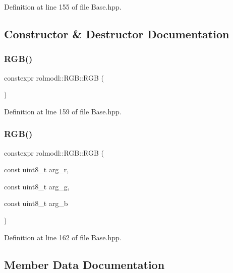 Definition at line 155 of file Base.\+hpp.



\subsection{Constructor \& Destructor Documentation}
\mbox{\label{structrolmodl_1_1_r_g_b_a8bb4c60c447cdf7bbac5c6379ec54359}} 
\subsubsection{\texorpdfstring{RGB()}{RGB()}\hspace{0.1cm}{\footnotesize\ttfamily [1/2]}}
{\footnotesize\ttfamily constexpr rolmodl\+::\+R\+G\+B\+::\+R\+GB (\begin{DoxyParamCaption}{ }\end{DoxyParamCaption})\hspace{0.3cm}{\ttfamily [inline]}}



Definition at line 159 of file Base.\+hpp.

\mbox{\label{structrolmodl_1_1_r_g_b_a9f2fdf965d5e0a9a720babd959cd5c25}} 
\subsubsection{\texorpdfstring{RGB()}{RGB()}\hspace{0.1cm}{\footnotesize\ttfamily [2/2]}}
{\footnotesize\ttfamily constexpr rolmodl\+::\+R\+G\+B\+::\+R\+GB (\begin{DoxyParamCaption}\item[{const uint8\+\_\+t}]{arg\+\_\+r,  }\item[{const uint8\+\_\+t}]{arg\+\_\+g,  }\item[{const uint8\+\_\+t}]{arg\+\_\+b }\end{DoxyParamCaption})\hspace{0.3cm}{\ttfamily [inline]}}



Definition at line 162 of file Base.\+hpp.



\subsection{Member Data Documentation}
\mbox{\label{structrolmodl_1_1_r_g_b_a7e7991be3e9e5a49388c0c811dbb66e3}} 
